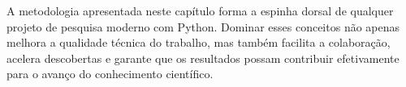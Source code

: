 A metodologia apresentada neste capítulo forma a espinha dorsal de qualquer projeto de pesquisa moderno com Python. Dominar esses conceitos não apenas melhora a qualidade técnica do trabalho, mas também facilita a colaboração, acelera descobertas e garante que os resultados possam contribuir efetivamente para o avanço do conhecimento científico.